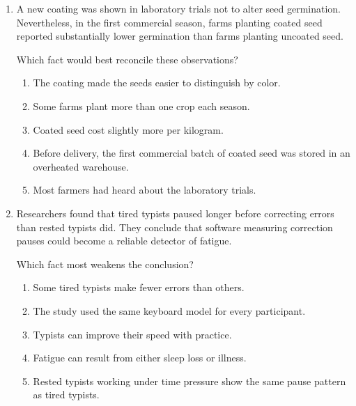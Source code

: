 \begin{enumerate}
Mira and Dev disagree about whether
\begin{enumerate}
\item bright flashes can damage delicate pigments
\item the archive should prohibit every form of visitor photography
\item phones are capable of taking photographs without a flash
\item the archive contains objects with delicate pigments
\item visitors sometimes forget to disable a flash
\end{enumerate}

\item A new coating was shown in laboratory trials not to alter seed germination. Nevertheless, in the first commercial season, farms planting coated seed reported substantially lower germination than farms planting uncoated seed.

Which fact would best reconcile these observations?
\begin{enumerate}
\item The coating made the seeds easier to distinguish by color.
\item Some farms plant more than one crop each season.
\item Coated seed cost slightly more per kilogram.
\item Before delivery, the first commercial batch of coated seed was stored in an overheated warehouse.
\item Most farmers had heard about the laboratory trials.
\end{enumerate}

\item Researchers found that tired typists paused longer before correcting errors than rested typists did. They conclude that software measuring correction pauses could become a reliable detector of fatigue.

Which fact most weakens the conclusion?
\begin{enumerate}
\item Some tired typists make fewer errors than others.
\item The study used the same keyboard model for every participant.
\item Typists can improve their speed with practice.
\item Fatigue can result from either sleep loss or illness.
\item Rested typists working under time pressure show the same pause pattern as tired typists.
\end{enumerate}


\end{enumerate}
